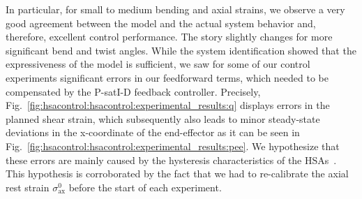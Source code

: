 In particular, for small to medium bending and axial strains, we observe a very good agreement between the model and the actual system behavior and, therefore, excellent control performance. 
The story slightly changes for more significant bend and twist angles. While the system identification showed that the expressiveness of the model is sufficient, we saw for some of our control experiments significant errors in our feedforward terms, which needed to be compensated by the P-satI-D feedback controller. Precisely, Fig.~\ref{fig:hsacontrol:hsacontrol:experimental_results:q} displays errors in the planned shear strain, which subsequently also leads to minor steady-state deviations in the x-coordinate of the end-effector as it can be seen in Fig.~\ref{fig:hsacontrol:hsacontrol:experimental_results:pee}. We hypothesize that these errors are mainly caused by the hysteresis characteristics of the \glspl{HSA}~\cite{good2022expanding}. This hypothesis is corroborated by the fact that we had to re-calibrate the axial rest strain $\sigma_\mathrm{ax}^0$ before the start of each experiment.